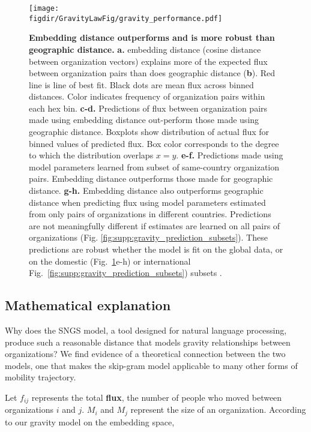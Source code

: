 \documentclass[12pt]{article} %
\def\figdir{../Figs}
\begin{document}
%
%
\begin{figure}[h!]
	\centering
	\texttt{[image: \\figdir/GravityLawFig/gravity\_performance.pdf]}
	\caption{
		\textbf{Embedding distance outperforms and is more robust than geographic distance.}
		\textbf{a.} embedding distance (cosine distance between organization vectors) explains more of the expected flux between organization pairs than does geographic distance (\textbf{b}). 
		Red line is line of best fit. 
		Black dots are mean flux across binned distances.
		Color indicates frequency of organization pairs within each hex bin.
		\textbf{c-d.} Predictions  of flux between organization pairs made using embedding distance out-perform those made using geographic distance. 
		Boxplots show distribution of actual flux for binned values of predicted flux.
		Box color corresponds to the degree to which the distribution overlaps $x = y$.
		\textbf{e-f.} Predictions made using model parameters learned from subset of same-country organization pairs. 
		Embedding distance outperforms those made for geographic distance.
		\textbf{g-h.} Embedding distance also outperforms geographic distance when predicting flux using model parameters estimated from only pairs of organizations in different countries. 
		Predictions are not meaningfully different if estimates are learned on all pairs of organizations (Fig. \ref{fig:supp:gravity_prediction_subsets}).
		These predictions are robust whether the model is fit on the global data, or on the domestic (Fig.~\ref{fig:gravity_performance}e-h) or international Fig.~\ref{fig:supp:gravity_prediction_subsets}) subsets .
	}
	\label{fig:gravity_performance}
\end{figure}


%
%
\subsection*{Mathematical explanation}

Why does the SNGS model, a tool designed for natural language processing, produce such a reasonable distance that models gravity relationships between organizations?
We find evidence of a theoretical connection between the two models, one that makes the skip-gram model applicable to many other forms of mobility trajectory. 

Let $f_{ij}$ represents the total \textbf{flux}, the number of people who moved between organizations $i$ and $j$. $M_{i}$ and $M_{j}$ represent the size of an organization. According to our gravity model on the embedding space,
\end{document}
